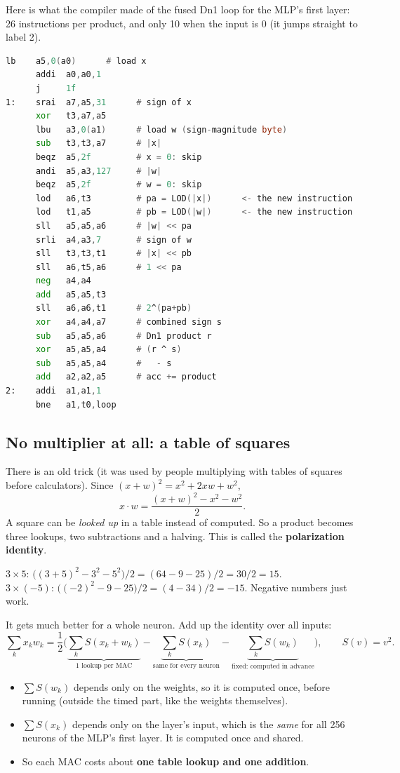 Here is what the compiler made of the fused Dn1 loop for the MLP's first layer: 26 instructions per product,
and only 10 when the input is 0 (it jumps straight to label 2).
\begin{lstlisting}[language=asm]
      lb    a5,0(a0)      # load x
      addi  a0,a0,1
      j     1f
1:    srai  a7,a5,31      # sign of x
      xor   t3,a7,a5
      lbu   a3,0(a1)      # load w (sign-magnitude byte)
      sub   t3,t3,a7      # |x|
      beqz  a5,2f         # x = 0: skip
      andi  a5,a3,127     # |w|
      beqz  a5,2f         # w = 0: skip
      lod   a6,t3         # pa = LOD(|x|)      <- the new instruction
      lod   t1,a5         # pb = LOD(|w|)      <- the new instruction
      sll   a5,a5,a6      # |w| << pa
      srli  a4,a3,7       # sign of w
      sll   t3,t3,t1      # |x| << pb
      sll   a6,t5,a6      # 1 << pa
      neg   a4,a4
      add   a5,a5,t3
      sll   a6,a6,t1      # 2^(pa+pb)
      xor   a4,a4,a7      # combined sign s
      sub   a5,a5,a6      # Dn1 product r
      xor   a5,a5,a4      # (r ^ s)
      sub   a5,a5,a4      #   - s
      add   a2,a2,a5      # acc += product
2:    addi  a1,a1,1
      bne   a1,t0,loop
\end{lstlisting}

\subsection{No multiplier at all: a table of squares}\label{sec:sqtab}

There is an old trick (it was used by people multiplying with tables of squares before calculators). Since
$(x+w)^2 = x^2 + 2xw + w^2$,
\[
  x\cdot w = \frac{(x+w)^2 - x^2 - w^2}{2}.
\]
A square can be \emph{looked up} in a table instead of computed. So a product becomes three lookups, two
subtractions and a halving. This is called the \textbf{polarization identity}.

\begin{example}
$3\times5$: $\big((3+5)^2 - 3^2 - 5^2\big)/2 = (64 - 9 - 25)/2 = 30/2 = 15$.\\
$3\times(-5)$: $\big((-2)^2 - 9 - 25\big)/2 = (4-34)/2 = -15$. Negative numbers just work.
\end{example}

It gets much better for a whole neuron. Add up the identity over all inputs:
\[
  \sum_k x_k w_k = \frac{1}{2}\Big(\underbrace{\sum_k S(x_k+w_k)}_{\text{1 lookup per MAC}}
  - \underbrace{\sum_k S(x_k)}_{\text{same for every neuron}}
  - \underbrace{\sum_k S(w_k)}_{\text{fixed: computed in advance}}\Big),\qquad S(v) = v^2.
\]
\begin{itemize}
  \item $\sum S(w_k)$ depends only on the weights, so it is computed once, before running (outside the
        timed part, like the weights themselves).
  \item $\sum S(x_k)$ depends only on the layer's input, which is the \emph{same} for all 256 neurons of the
        MLP's first layer. It is computed once and shared.
  \item So each MAC costs about \textbf{one table lookup and one addition}.
\end{itemize}

